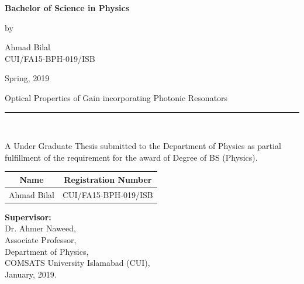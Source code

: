 \documentclass[12pt]{report}
\begin{document}
	\vspace{0.5 in}
	
	\begin{center}
		{\Large {\textbf{Bachelor of Science in Physics}} }
	\end{center}
	
	\vspace{0.5 in}
	\begin{center}
		{by }
	\end{center}
	\begin{center}
		{\large {Ahmad Bilal\\[0pt]
				CUI/FA15-BPH-019/ISB\\[0pt]
		}}
	\end{center}
	\vspace{0.5 in}
	\begin{center}
		Spring, 2019
	\end{center}
	\newpage
	\begin{center}
{\Large {Optical Properties of Gain incorporating Photonic Resonators}\\[0pt]
		\noindent\rule{18cm}{3pt}} \\
\end{center}
\vspace{0.2 in} 
		A Under Graduate Thesis submitted to the Department of Physics as partial fulfillment of the requirement for the award of Degree of BS (Physics). 
\vspace{0.5 in}
\begin{center}
	\begin{tabular}{ | c| c | }
			\hline
			Name &  Registration Number \\
			\hline
		Ahmad Bilal & CUI/FA15-BPH-019/ISB \\ 
			\hline
	\end{tabular}
\end{center}
	\vspace{3 in}
	\textbf {Supervisor:}\\
	Dr. Ahmer Naweed,\\
	Associate Professor,\\
	Department of Physics,\\
	COMSATS University Islamabad (CUI),\\
	January, 2019.
	\newpage
	
\end{document}
